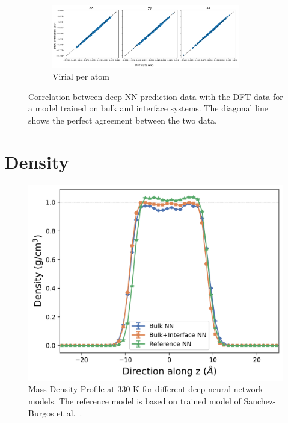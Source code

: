 \begin{figure}[tbhp]
\begin{subfigure}{0.9\textwidth}
    \includegraphics[width=0.9\textwidth]{images/bulk+interface_NN_on_interface/2_virial_peratom.png}
    \caption{Virial per atom}
    \label{fig:corr_bulk+interface_NN_P}
  \end{subfigure}
  \caption{Correlation between deep NN prediction data with the DFT data for
    a
    model trained on bulk and interface systems. The
    diagonal line shows the perfect agreement between the two data.}
  \label{fig:corr_bulk+interface_NN}
\end{figure}

\section{Density}

\begin{figure}[h!]
  \centering
  \includegraphics[width=0.7\linewidth]{images/density_330.png}
  \caption{Mass Density Profile at 330 K for different deep neural network
    models. The reference model is based on trained model of Sanchez-Burgos et
    al.~\cite{sanchez2023deep}. }
  \label{fig:density}
\end{figure}

